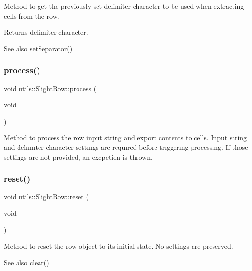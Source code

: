 Method to get the previously set delimiter character to be used when extracting cells from the row. \begin{DoxyReturn}{Returns}
delimiter character. 
\end{DoxyReturn}
\begin{DoxySeeAlso}{See also}
\hyperlink{classutils_1_1SlightRow_a134dbf724d45204294e439733540ba4a}{set\+Separator()} 
\end{DoxySeeAlso}
\mbox{\label{classutils_1_1SlightRow_a9774969c2a0276491ab368216c2592a0}} 
\subsubsection{\texorpdfstring{process()}{process()}}
{\footnotesize\ttfamily void utils\+::\+Slight\+Row\+::process (\begin{DoxyParamCaption}\item[{void}]{ }\end{DoxyParamCaption})}

Method to process the row input string and export contents to cells. Input string and delimiter character settings are required before triggering processing. If those settings are not provided, an excpetion is thrown. \mbox{\label{classutils_1_1SlightRow_ad323829080b35608b2e5764ed735d4dc}} 
\subsubsection{\texorpdfstring{reset()}{reset()}}
{\footnotesize\ttfamily void utils\+::\+Slight\+Row\+::reset (\begin{DoxyParamCaption}\item[{void}]{ }\end{DoxyParamCaption})}

Method to reset the row object to its initial state. No settings are preserved. \begin{DoxySeeAlso}{See also}
\hyperlink{classutils_1_1SlightRow_abd5fa1b875373906c801611a9e051c31}{clear()} 
\end{DoxySeeAlso}
\mbox{\label{classutils_1_1SlightRow_afab9a3c238d96208e1902da833845e1d}} 
